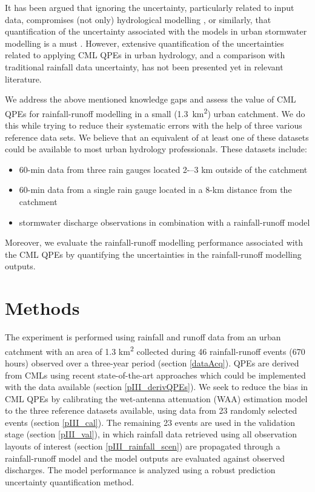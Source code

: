 \documentclass{ctuthesis}\usepackage[]{graphicx}\usepackage[]{color}
\begin{document}
It has been argued that ignoring the uncertainty, particularly related to input data, compromises (not only) hydrological modelling \citep{beven2006undermining, kavetskiBayesianAnalysisInput2006}, or similarly, that quantification of the uncertainty associated with the models in urban stormwater modelling is a must \citep{dotto2012comparison}. However, extensive quantification of the uncertainties related to applying CML QPEs in urban hydrology, and a comparison with traditional rainfall data uncertainty, has not been presented yet in relevant literature.

We address the above mentioned knowledge gaps and assess the value of CML QPEs for rainfall-runoff modelling in a small (1.3~km\textsuperscript{2}) urban catchment. We do this while trying to reduce their systematic errors with the help of three various reference data sets. We believe that an equivalent of at least one of these datasets could be available to most urban hydrology professionals. These datasets include:
\begin{itemize}
        \item 60-min data from three rain gauges located 2-–3 km outside of the catchment
        \item 60-min data from a single rain gauge located in a 8-km distance from the catchment
        \item stormwater discharge observations in combination with a rainfall-runoff model 
\end{itemize}

Moreover, we evaluate the rainfall-runoff modelling performance associated with the CML QPEs by quantifying the uncertainties in the rainfall-runoff modelling outputs.



\section{Methods} \label{paperIIIMnM}

The experiment is performed using rainfall and runoff data from an urban catchment with an area of 1.3 km\textsuperscript{2} collected during 46 rainfall-runoff events (670 hours) observed over a three-year period (section \ref{dataAcq}). QPEs are derived from CMLs using recent state-of-the-art approaches which could be implemented with the data available (section \ref{pIII_derivQPEs}). We seek to reduce the bias in CML QPEs by calibrating the wet-antenna attenuation (WAA) estimation model to the three reference datasets available, using data from 23 randomly selected events (section \ref{pIII_cal}). The remaining 23 events are used in the validation stage (section \ref{pIII_val}), in which rainfall data retrieved using all observation layouts of interest (section \ref{pIII_rainfall_scen}) are propagated through a rainfall-runoff model and the model outputs are evaluated against observed discharges. The model performance is analyzed using a robust prediction uncertainty quantification method.
\end{document}

